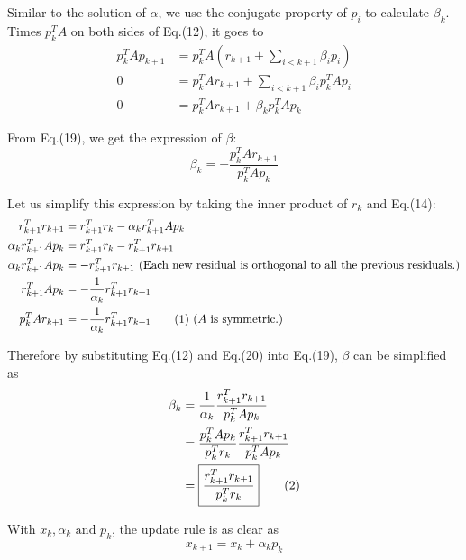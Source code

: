 \documentclass{article}
\newcommand\numberthis{\addtocounter{equation}{1}\tag{\theequation}}
\begin{document}
Similar to the solution of $\alpha$, we use the conjugate property of $ p_i$ to calculate $\beta_k$. Times $ p_k^TA$ on both sides of Eq.(12), it goes to
\begin{align}
    p_k^TA p_{k+1}&= p_k^TA( r_{k+1}+\sum_{i<k+1}\beta_i p_i)\\
   0&= p_k^TA r_{k+1}+\sum_{i<k+1}\beta_i p_k^TA p_i\\
   0&= p_k^TA r_{k+1}+\beta_k p_k^TA p_k
\end{align}

From Eq.(19), we get the expression of $\beta$:
\begin{equation}
    \beta_k=\boxed{-\frac{ p_k^TA r_{k+1}}{ p_k^TA p_k}}
\end{equation}

Let us simplify this expression by taking the inner product of $r_k$ and Eq.(14):
\begin{align*}
    r_{k+1}^Tr_{k+1}&=r_{k+1}^Tr_k-\alpha_k r_{k+1}^TAp_k\\
    \alpha_k r_{k+1}^TAp_k&=r_{k+1}^Tr_k-r_{k+1}^Tr_{k+1}\\
    \alpha_k r_{k+1}^TAp_k&=-r_{k+1}^Tr_{k+1}\text{ (Each new residual is orthogonal to all the previous residuals.)}\\
     r_{k+1}^TAp_k&=-\frac{1}{\alpha_k}r_{k+1}^Tr_{k+1}\\
     p_k^TAr_{k+1}&=-\frac{1}{\alpha_k}r_{k+1}^Tr_{k+1}\numberthis\text{ ($A$ is symmetric.)}
\end{align*}

Therefore by substituting Eq.(12) and Eq.(20) into Eq.(19), $\beta$ can be simplified as
\begin{align*}
    \beta_k&=\frac{1}{\alpha_k}\frac{r_{k+1}^Tr_{k+1}}{ p_k^TA p_k}\\
    &=\frac{p_k^TAp_k}{p_k^Tr_k}\frac{r_{k+1}^Tr_{k+1}}{ p_k^TA p_k}\\
    &=\boxed{\frac{r_{k+1}^Tr_{k+1}}{p_k^Tr_k}}\numberthis
\end{align*}

With $x_k,\alpha_k\text{ and } p_k$, the update rule is as clear as
\begin{equation}
   x_{k+1}=x_k+\alpha_k p_k
\end{equation}
\end{document}
